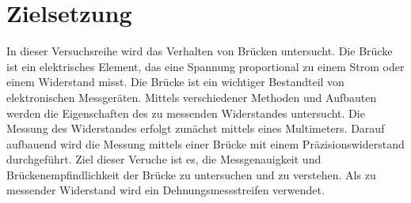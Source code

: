 \part{Zielsetzung}

In dieser Versuchsreihe wird das Verhalten von Brücken untersucht.
Die Brücke ist ein elektrisches Element, das eine Spannung proportional zu einem Strom oder einem Widerstand misst.
Die Brücke ist ein wichtiger Bestandteil von elektronischen Messgeräten.
Mittels verschiedener Methoden und Aufbauten werden die Eigenschaften des zu messenden Widerstandes untersucht.
Die Messung des Widerstandes erfolgt zunächst mittels eines Multimeters.
Darauf aufbauend wird die Messung mittels einer Brücke mit einem Präzisionswiderstand durchgeführt.
Ziel dieser Veruche ist es, die Messgenauigkeit und Brückenempfindlichkeit der Brücke zu untersuchen und zu verstehen.
Als zu messender Widerstand wird ein Dehnungsmessstreifen verwendet.